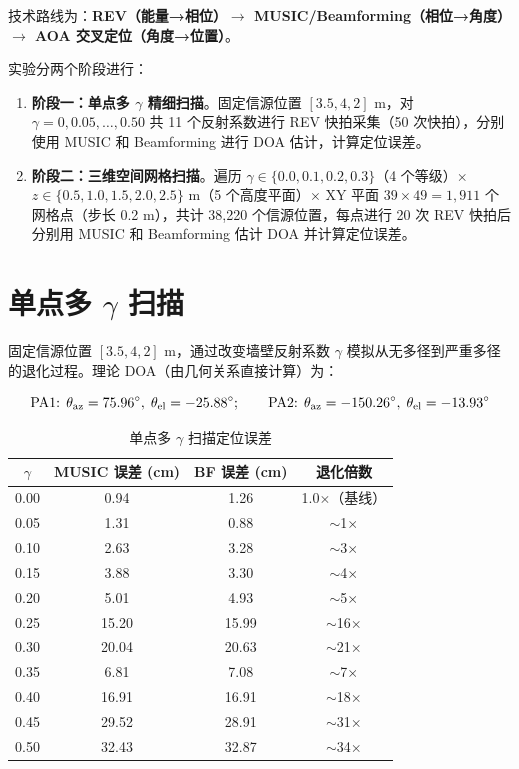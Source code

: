 \documentclass[12pt,a4paper]{ctexart}
\begin{document}
技术路线为：\textbf{REV（能量→相位）$\rightarrow$ MUSIC/Beamforming（相位→角度）$\rightarrow$ AOA 交叉定位（角度→位置）}。

实验分两个阶段进行：

\begin{enumerate}
    \item \textbf{阶段一：单点多 $\gamma$ 精细扫描}。固定信源位置 $[3.5, 4, 2]$ m，对 $\gamma = 0, 0.05, \dots, 0.50$ 共 11 个反射系数进行 REV 快拍采集（50 次快拍），分别使用 MUSIC 和 Beamforming 进行 DOA 估计，计算定位误差。
    \item \textbf{阶段二：三维空间网格扫描}。遍历 $\gamma \in \{0.0, 0.1, 0.2, 0.3\}$（4 个等级）$\times$ $z \in \{0.5, 1.0, 1.5, 2.0, 2.5\}$ m（5 个高度平面）$\times$ XY 平面 $39 \times 49 = 1{,}911$ 个网格点（步长 0.2 m），共计 38{,}220 个信源位置，每点进行 20 次 REV 快拍后分别用 MUSIC 和 Beamforming 估计 DOA 并计算定位误差。
\end{enumerate}

\section{单点多 $\gamma$ 扫描}

固定信源位置 $[3.5, 4, 2]$ m，通过改变墙壁反射系数 $\gamma$ 模拟从无多径到严重多径的退化过程。理论 DOA（由几何关系直接计算）为：

\[
\text{PA1: } \theta_{\rm az}=75.96^\circ,\; \theta_{\rm el}=-25.88^\circ;\qquad
\text{PA2: } \theta_{\rm az}=-150.26^\circ,\; \theta_{\rm el}=-13.93^\circ
\]

\begin{table}[H]
\centering
\caption{单点多 $\gamma$ 扫描定位误差}
\begin{tabular}{cccc}
\toprule
\textbf{$\gamma$} & \textbf{MUSIC 误差 (cm)} & \textbf{BF 误差 (cm)} & \textbf{退化倍数} \\
\midrule
0.00 & 0.94  & 1.26  & 1.0$\times$（基线） \\
0.05 & 1.31  & 0.88  & $\sim$1$\times$ \\
0.10 & 2.63  & 3.28  & $\sim$3$\times$ \\
0.15 & 3.88  & 3.30  & $\sim$4$\times$ \\
0.20 & 5.01  & 4.93  & $\sim$5$\times$ \\
0.25 & 15.20 & 15.99 & $\sim$16$\times$ \\
0.30 & 20.04 & 20.63 & $\sim$21$\times$ \\
0.35 & 6.81  & 7.08  & $\sim$7$\times$ \\
0.40 & 16.91 & 16.91 & $\sim$18$\times$ \\
0.45 & 29.52 & 28.91 & $\sim$31$\times$ \\
0.50 & 32.43 & 32.87 & $\sim$34$\times$ \\
\bottomrule
\end{tabular}
\end{table}
\end{document}

